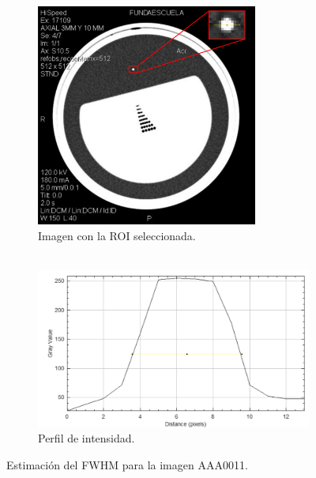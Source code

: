 \documentclass[letterpaper,12pt]{article}
\theoremstyle{plain}
\begin{document}
\begin{figure}[h]
    \centering
         \begin{subfigure}[h]{0.49\linewidth}
            \centering
            \includegraphics[width=0.8\textwidth]{Figuras/roi_zoom_corte11.png}
            \caption{Imagen con la ROI seleccionada. \\
            $~$} 
         \end{subfigure}
         \begin{subfigure}[h]{0.49\linewidth}
            \centering
            \includegraphics[width=1.1\textwidth]{Figuras/profile_corte11.png}
            \caption{Perfil de intensidad.}
         \end{subfigure}
    \caption{Estimación del FWHM para la imagen AAA0011.}
    \label{fig:FWHM}
\end{figure}
\end{document}
